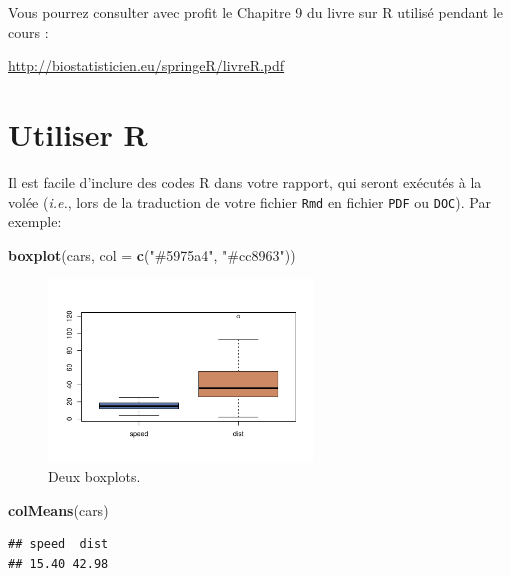 \documentclass[mstat,12pt]{unswthesis}
\newenvironment{Shaded}{\begin{snugshade}}{\end{snugshade}}
\newcommand{\AttributeTok}[1]{\textcolor[rgb]{0.13,0.29,0.53}{#1}}
\newcommand{\FunctionTok}[1]{\textcolor[rgb]{0.13,0.29,0.53}{\textbf{#1}}}
\newcommand{\NormalTok}[1]{#1}
\newcommand{\StringTok}[1]{\textcolor[rgb]{0.31,0.60,0.02}{#1}}
\begin{document}
Vous pourrez consulter avec profit le Chapitre 9 du livre sur R utilisé
pendant le cours :

\url{http://biostatisticien.eu/springeR/livreR.pdf}

\section{Utiliser R}\label{utiliser-r}

Il est facile d'inclure des codes R dans votre rapport, qui seront
exécutés à la volée (\emph{i.e.}, lors de la traduction de votre fichier
\texttt{Rmd} en fichier \texttt{PDF} ou \texttt{DOC}). Par exemple:

\begin{Shaded}
\begin{Highlighting}[]
\FunctionTok{boxplot}\NormalTok{(cars, }\AttributeTok{col =} \FunctionTok{c}\NormalTok{(}\StringTok{"\#5975a4"}\NormalTok{, }\StringTok{"\#cc8963"}\NormalTok{))}
\end{Highlighting}
\end{Shaded}

\begin{figure}

{\centering \includegraphics[width=7cm]{scdon2-UPV-report-template_sansPython_files/figure-latex/unnamed-chunk-3-1} 

}

\caption{\label{fig:boxplots}Deux boxplots.}\label{fig:unnamed-chunk-3}
\end{figure}

\begin{Shaded}
\begin{Highlighting}[]
\FunctionTok{colMeans}\NormalTok{(cars)}
\end{Highlighting}
\end{Shaded}

\begin{verbatim}
## speed  dist 
## 15.40 42.98
\end{verbatim}
\end{document}
